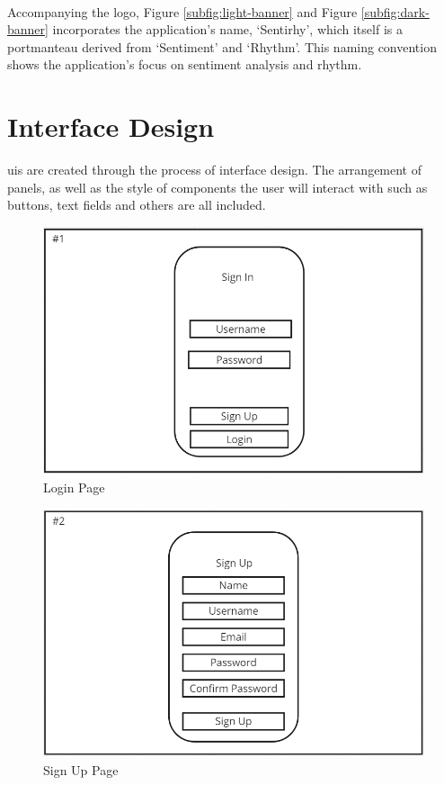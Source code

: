 \\
\indent Accompanying the logo, Figure \ref{subfig:light-banner} and Figure \ref{subfig:dark-banner} incorporates the application's name, `Sentirhy', which itself is a portmanteau derived from `Sentiment' and `Rhythm'.
This naming convention shows the application's focus on sentiment analysis and rhythm.
\\
\section{Interface Design}
\gls{ui}s are created through the process of interface design.
The arrangement of panels, as well as the style of components the user will interact with such as buttons, text fields and others are all included.
\begin{figure}[!ht]
    \centering
    \includegraphics[width=12cm]{Images/login.png}
    \caption{Login Page}
    \label{fig:login}
\end{figure}
\begin{figure}[!ht]
    \centering
    \includegraphics[width=12cm]{Images/signup.png}
    \caption{Sign Up Page}
    \label{fig:signup}
\end{figure}
